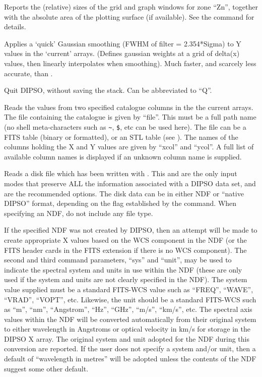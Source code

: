 \begin {description}
Reports the (relative) sizes of the grid and graph windows for zone
``Zn'', together with the absolute area of the plotting surface (if
available). See the   command for details.

Applies a `quick' Gaussian smoothing (FWHM of filter = 2.354*Sigma) to
Y values in the `current' arrays. (Defines gaussian weights at a grid
of delta(x) values, then linearly interpolates when smoothing). Much
faster, and scarcely less accurate, than . 

Quit DIPSO, without saving the stack. Can be abbreviated to ``Q''.

Reads the values from two specified catalogue columns in the the current
arrays. The file containing the catalogue is given by ``file''. This must
be a full path name (no shell meta-characters such as \verb+~+, \verb+$+,
etc can be used here). The file can be a FITS table (binary or formatted), 
or an STL table (see  ). The names of the columns 
holding the X and Y values are given by ``xcol'' and ``ycol''. A full list 
of available column names is displayed if an unknown column name is supplied.

Reads a disk file which has been written with 
.  This and   
are the
only input modes that preserve ALL the information associated with a DIPSO
data set, and are the recommended options. The disk data can be in either NDF or
``native DIPSO'' format, depending on the flag established by the  
command. When specifying an NDF, do not include any file type.

If the specified NDF was not created by DIPSO, then an attempt will be
made to create appropriate X values based on the WCS component in the
NDF (or the FITS header cards in the FITS extension if there is no WCS
component). The second and third command parameters, ``sys'' and ``unit'',
may be used to indicate the spectral system and units in use within the NDF
(these are only used if the system and units are not clearly specified in
the NDF). The system value supplied must be a standard FITS-WCS value such as 
``FREQ'', ``WAVE'', ``VRAD'', ``VOPT'', etc. Likewise, the unit should be
a standard FITS-WCS such as ``m'', ``nm'', ``Angstrom'', ``Hz'', ``GHz'',
``m/s'', ``km/s'', etc. The spectral axis values within the NDF will be
converted automatically from their original system to either wavelength in 
Angstroms or optical velocity in km/s for storage in the DIPSO X array. The 
original system and unit adopted for the NDF during this conversion are 
reported. If the user does not specify a system and/or unit, then a
default of ``wavelength in metres'' will be adopted unless the contents
of the NDF suggest some other default.


\end{description}

